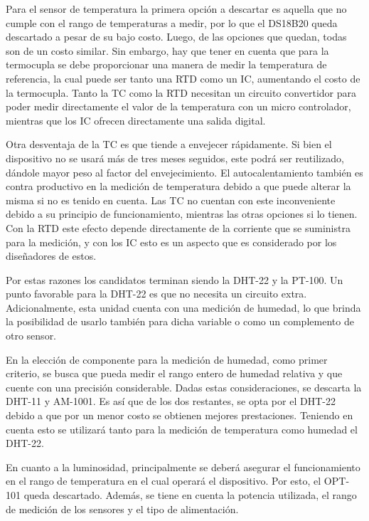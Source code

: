 
Para el sensor de temperatura la primera opción a descartar es aquella que no cumple con el rango de temperaturas a medir, por lo que el DS18B20 queda descartado a pesar de su bajo costo. Luego, de las opciones que quedan, todas son de un costo similar. Sin embargo, hay que tener en cuenta que para la termocupla se debe proporcionar una manera de medir la temperatura de referencia, la cual puede ser tanto una RTD como un IC, aumentando el costo de la termocupla. Tanto la TC como la RTD necesitan un circuito convertidor para poder medir directamente el valor de la temperatura con un micro controlador, mientras que los IC ofrecen directamente una salida digital.%

Otra desventaja de la TC es que tiende a envejecer rápidamente. Si bien el dispositivo no se usará más de tres meses seguidos, este podrá ser reutilizado, dándole mayor peso al factor del envejecimiento. El autocalentamiento también es contra productivo en la medición de temperatura debido a que puede alterar la misma si no es tenido en cuenta. Las TC no cuentan con este inconveniente debido a su principio de funcionamiento, mientras las otras opciones si lo tienen. Con la RTD este efecto depende directamente de la corriente que se suministra para la medición, y con los IC esto es un aspecto que es considerado por los diseñadores de estos.

Por estas razones los candidatos terminan siendo la DHT-22 y la PT-100. Un punto favorable para la DHT-22 es que no necesita un circuito extra. Adicionalmente, esta unidad cuenta con una medición de humedad, lo que brinda la posibilidad de usarlo también para dicha variable o como un complemento de otro sensor.

En la elección de componente para la medición de humedad, como primer criterio, se busca que pueda medir el rango entero de humedad relativa y que cuente con una precisión considerable. Dadas estas consideraciones, se descarta la DHT-11 y AM-1001. Es así que de los dos restantes, se opta por el DHT-22 debido a que por un menor costo se obtienen mejores prestaciones. Teniendo en cuenta esto se utilizará tanto para la medición de temperatura como humedad el DHT-22.


En cuanto a la luminosidad, principalmente se deberá asegurar el funcionamiento en el rango de temperatura en el cual operará el dispositivo. Por esto, el OPT-101 queda descartado. Además, se tiene en cuenta la potencia utilizada, el rango de medición de los sensores y el tipo de alimentación.

